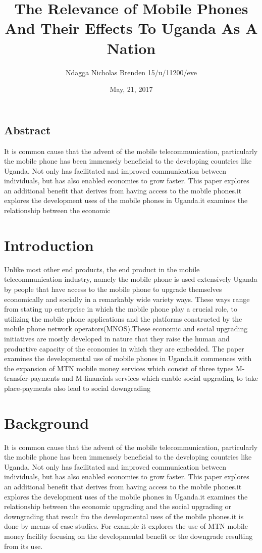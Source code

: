 \documentclass[12]{article}
\begin{document}
\title{The Relevance of Mobile Phones And Their Effects To Uganda As A Nation}
\author{Ndagga Nicholas Brenden 15/u/11200/eve}
\date{May, 21, 2017}
\maketitle

\newpage


\subsection{Abstract}
It is common cause that the advent of the mobile telecommunication, particularly the mobile phone has been immensely beneficial to the developing countries like Uganda. Not only has facilitated and improved communication between individuals, but has also enabled economies to grow faster. This paper explores an additional benefit that derives from having access to the mobile phones.it explores the development uses of the mobile phones in Uganda.it examines the relationship between the economic 

\section{Introduction}
Unlike most other end products, the end product in the mobile telecommunication industry, namely the mobile phone is used extensively  Uganda by people that have access to the mobile phone to upgrade themselves economically  and socially in a remarkably wide variety ways. These  ways range from stating up enterprise in which the mobile phone play a crucial role, to utilizing the mobile phone applications and the platforms constructed by the mobile phone network operators(MNOS).These economic and social upgrading initiatives are mostly developed in nature that they raise the human and productive capacity of the economies in which they are embedded.
The paper examines the developmental use of mobile phones in Uganda.it commences with the expansion of MTN mobile money services which consist of three types M-transfer-payments and  M-financials services which enable social upgrading to take place-payments also lead to social downgrading

\section{Background}
	It is common cause that the advent of the mobile telecommunication, particularly the mobile phone has been immensely beneficial to the developing countries like Uganda. Not only has facilitated and improved communication between individuals, but has also enabled economies to grow faster. This paper explores an additional benefit that derives from having access  to the mobile phones.it explores the development uses of the mobile phones in Uganda.it examines the relationship between the economic upgrading and the social upgrading or downgrading that result fro the developmental uses of the mobile phones.it is done by means of case studies. For example it explores the use of MTN mobile money facility focusing on the developmental benefit or the downgrade resulting from its use.
\end{document}
